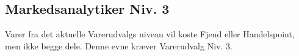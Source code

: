 \subsection{Markedsanalytiker Niv. 3}
Varer fra det aktuelle Varerudvalgs niveau vil koste Fjend eller Handelspoint, men ikke begge dele. Denne evne kræver Varerudvalg Niv. 3.\\




